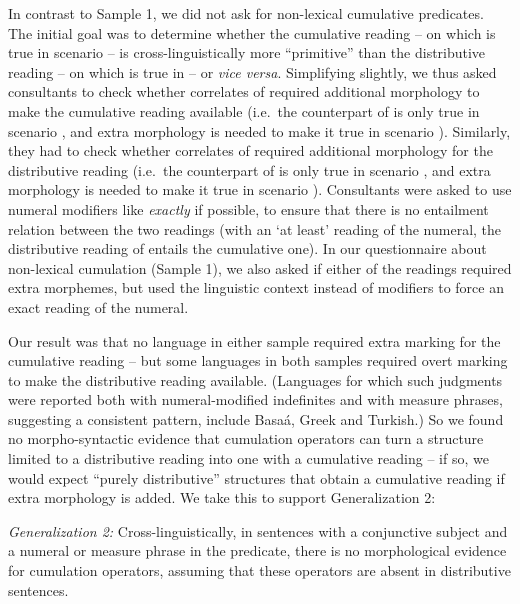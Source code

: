 \documentclass[output=paper]{langscibook}
\begin{document}
In contrast to Sample 1, we did not ask for non-lexical cumulative predicates. The initial goal was to determine whether the cumulative reading -- on which  is true in scenario  -- is cross-linguistically more ``primitive'' than the distributive reading -- on which  is true in  -- or \textit{vice versa}. Simplifying slightly, we thus asked consultants to check whether correlates of  required additional morphology to make the cumulative reading available (i.e.~the counterpart of  is only true in scenario  , and extra morphology is needed to make it true in scenario  ). Similarly, they had to check whether correlates of  required additional morphology for the distributive reading (i.e.~the counterpart of  is only true in scenario , and extra morphology is needed to make it true in scenario ). Consultants were asked to use numeral modifiers like \textit{exactly} if possible, to ensure that there is no entailment relation between the two readings (with an `at least' reading of the numeral, the distributive reading of  entails the cumulative one). In our questionnaire about non-lexical cumulation (Sample 1), we also asked if either of the readings required extra morphemes, but used the linguistic context instead of modifiers to force an exact reading of the numeral.

Our result was that no language in either sample required extra marking for the cumulative reading -- but some languages in both samples required overt marking to make the distributive reading available. (Languages for which such judgments were reported both with numeral-modified indefinites and with measure phrases, suggesting a consistent pattern, include Basaá, Greek and Turkish.) So we found no morpho-syntactic evidence that cumulation operators can turn a structure limited to a distributive reading into one with a cumulative reading -- if so, we would expect ``purely distributive'' structures that obtain a cumulative reading if extra morphology is added. We take this to support Generalization 2:

\eanoraggedright\sloppy \textit{Generalization 2:} Cross-linguistically, in sentences with a conjunctive subject and a numeral or measure phrase
 in the predicate, there is no morphological evidence for cumulation operators, assuming that these operators are absent in distributive sentences. \z
\end{document}
